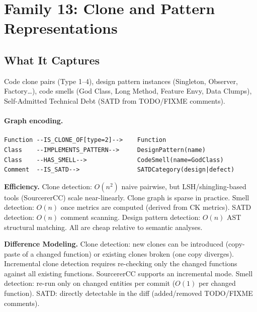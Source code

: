 \documentclass[12pt,a4paper]{article}
\begin{document}
\section{Family 13: Clone and Pattern Representations}

\subsection{What It Captures}

Code clone pairs (Type 1--4), design pattern instances (Singleton, Observer,
Factory\ldots), code smells (God Class, Long Method, Feature Envy,
Data Clumps), Self-Admitted Technical Debt (SATD from TODO/FIXME comments).

\paragraph{Graph encoding.}
\begin{lstlisting}
Function --IS_CLONE_OF[type=2]-->    Function
Class    --IMPLEMENTS_PATTERN-->     DesignPattern(name)
Class    --HAS_SMELL-->              CodeSmell(name=GodClass)
Comment  --IS_SATD-->                SATDCategory(design|defect)
\end{lstlisting}

\begin{effbox}
\textbf{Efficiency.}
Clone detection: $O(n^2)$ naive pairwise, but LSH/shingling-based tools
(SourcererCC) scale near-linearly. Clone graph is sparse in practice.
Smell detection: $O(n)$ once metrics are computed (derived from CK metrics).
SATD detection: $O(n)$ comment scanning. Design pattern detection: $O(n)$
AST structural matching. All are cheap relative to semantic analyses.
\end{effbox}

\begin{diffbox}
\textbf{Difference Modeling.}
Clone detection: new clones can be introduced (copy-paste of a changed
function) or existing clones broken (one copy diverges). Incremental clone
detection requires re-checking only the changed functions against all existing
functions. SourcererCC supports an incremental mode. Smell detection: re-run
only on changed entities per commit ($O(1)$ per changed function). SATD:
directly detectable in the diff (added/removed TODO/FIXME comments).
\end{diffbox}
\end{document}

